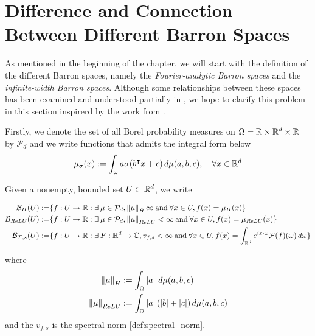 \section{Difference and Connection Between Different Barron Spaces}
\label{sec:diff_barron_spaces}


As mentioned in the beginning of the chapter, we will start with the definition
of the different Barron spaces, namely the \textit{Fourier-analytic Barron
spaces} and the \textit{infinite-width Barron spaces}. Although some
relationships between these spaces has been examined and understood partially in
\cite{eBarronSpaceFlowinduced2021,eMathematicalUnderstandingNeural2020}, we hope
to clarify this problem in this section inspirerd by the work from
\cite{carageaNeuralNetworkApproximation2022}.

Firstly, we denote the set of all Borel probability measures on $\Omega = \mathbb{R}
\times \mathbb{R}^d \times \mathbb{R}$ by $\mathcal{P}_d$ and we write functions that admits the
integral form below
\begin{equation}
    \mu_{\sigma}(x) := \int_{\omega} a\sigma(b{}^{\intercal} x + c) \,d\mu(a,b,c), \quad
    \forall x \in \mathbb{R}^d
\end{equation}

Given a nonempty, bounded set $U \subset \mathbb{R}^d$, we write

\begin{align*}
    \mathcal{B}_{H}(U) :=
    & \{f: U \to \mathbb{R}: \exists\: \mu \in \mathcal{P}_d, \left\| \mu \right\|_H \infty 
    \:\text{and}\: \forall x \in U, f(x) = \mu_{H}(x) \} \\
    \mathcal{B}_{ReLU}(U) :=
    & \{f: U \to \mathbb{R}: \exists\: \mu \in \mathcal{P}_d, \left\| \mu \right\|_{ReLU} < \infty
    \:\text{and}\: \forall x \in U, f(x) = \mu_{ReLU}(x) \} \\
    \mathcal{B}_{\mathcal{F},s}(U) :=
    & \{f: U \to \mathbb{R}: \exists\: F: \mathbb{R}^d \to \mathbb{C}, v_{f,s} < \infty 
    \:\text{and}\: \forall x \in U, 
    f(x) = \int_{\mathbb{R}^d} e^{ix \cdot \omega} \mathcal{F}(f)(\omega) \,d\omega \} \\
\end{align*}

where
\begin{align*}
    \left\| \mu \right\|_H      &:= \int_{\Omega} \left| a \right|\,d\mu(a,b,c) \\
    \left\| \mu \right\|_{ReLU} &:= \int_{\Omega} \left| a \right| (\left| b \right| + \left| c \right|)\,d\mu(a,b,c) \\ 
\end{align*}
and the $v_{f,s}$ is the spectral norm \eqref{def:spectral_norm}.

